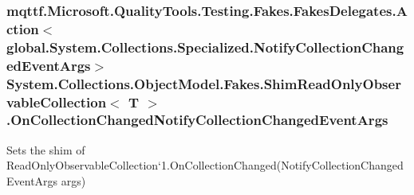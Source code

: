 \hypertarget{class_system_1_1_collections_1_1_object_model_1_1_fakes_1_1_shim_read_only_observable_collection_3_01_t_01_4_a3a8be502cc8198fc9513a1381ff10916}{
\subsubsection[{On\-Collection\-Changed\-Notify\-Collection\-Changed\-Event\-Args}]{\setlength{\rightskip}{0pt plus 5cm}mqttf.\-Microsoft.\-Quality\-Tools.\-Testing.\-Fakes.\-Fakes\-Delegates.\-Action$<$global.\-System.\-Collections.\-Specialized.\-Notify\-Collection\-Changed\-Event\-Args$>$ System.\-Collections.\-Object\-Model.\-Fakes.\-Shim\-Read\-Only\-Observable\-Collection$<$ T $>$.On\-Collection\-Changed\-Notify\-Collection\-Changed\-Event\-Args\hspace{0.3cm}{\ttfamily [set]}}}\label{class_system_1_1_collections_1_1_object_model_1_1_fakes_1_1_shim_read_only_observable_collection_3_01_t_01_4_a3a8be502cc8198fc9513a1381ff10916}


Sets the shim of Read\-Only\-Observable\-Collection`1.On\-Collection\-Changed(\-Notify\-Collection\-Changed\-Event\-Args args)

